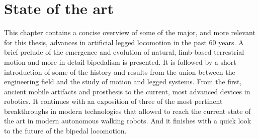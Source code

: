 \chapter{State of the art} %
\label{cha:state_of_the_art}
This chapter contains a concise overview of some of the major, and more relevant for this thesis, advances in artificial legged locomotion in the past 60 years.
A brief prelude of the emergence and evolution of natural, limb-based terrestrial motion and more in detail bipedalism is presented.
It is followed by a short introduction of some of the history and results from the union between the engineering field and the study of motion and legged systems. 
From the first, ancient mobile artifacts and prosthesis to the current, most advanced devices in robotics.
It continues with an exposition of three of the most pertinent breakthroughs in modern technologies that allowed to reach the current state of the art in modern autonomous walking robots.
And it finishes with a quick look to the future of the bipedal locomotion.





%
%





